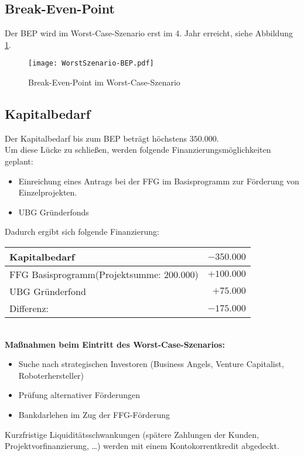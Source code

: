 \subsection{Break-Even-Point}
Der BEP wird im Worst-Case-Szenario erst im 4. Jahr erreicht, siehe Abbildung \ref{fig:WorstSzenario-BEP}.
\begin{figure}[h]
	\centering
	\texttt{[image: WorstSzenario-BEP.pdf]}
	\caption{Break-Even-Point im Worst-Case-Szenario}
	\label{fig:WorstSzenario-BEP}
\end{figure}

\subsection{Kapitalbedarf}
Der Kapitalbedarf bis zum BEP beträgt höchstens $350.000$\officialeuro.\\
Um diese Lücke zu schließen, werden folgende Finanzierungsmöglichkeiten geplant:
\begin{itemize}
	\item Einreichung eines Antrags bei der FFG im Basisprogramm zur Förderung von Einzelprojekten.
	\item UBG Gründerfonds
\end{itemize}
Dadurch ergibt sich folgende Finanzierung:\\
\begin{tabular}{l r}
	Kapitalbedarf & $-350.000$\officialeuro \\
	\hline
	FFG Basisprogramm(Projektsumme: $200.000$\officialeuro) & $+100.000$\officialeuro \\
	UBG Gründerfond & $+75.000$\officialeuro \\
	\bottomrule
	Differenz: & $-175.000$\officialeuro
\end{tabular}\\

\textbf{Maßnahmen beim Eintritt des Worst-Case-Szenarios:}
\begin{itemize}
	\item Suche nach strategischen Investoren (Business Angels, Venture Capitalist, Roboterhersteller)
	\item Prüfung alternativer Förderungen
	\item Bankdarlehen im Zug der FFG-Förderung
\end{itemize}
Kurzfristige Liquiditätsschwankungen (spätere Zahlungen der Kunden, Projektvorfinanzierung, …) werden mit einem Kontokorrentkredit abgedeckt.